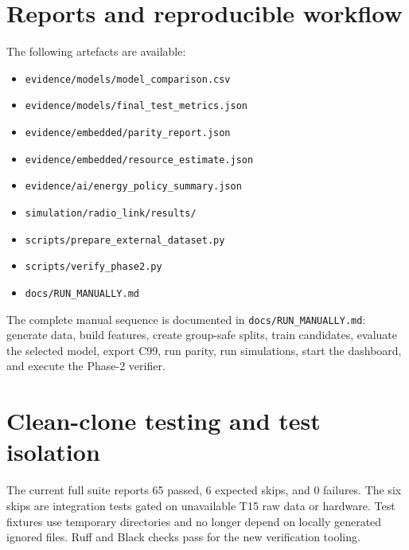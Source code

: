 \documentclass[11pt,a4paper]{article}
\begin{document}
\section{Reports and reproducible workflow}
The following artefacts are available:
\begin{itemize}[leftmargin=*]
  \item \texttt{evidence/models/model\_comparison.csv}
  \item \texttt{evidence/models/final\_test\_metrics.json}
  \item \texttt{evidence/embedded/parity\_report.json}
  \item \texttt{evidence/embedded/resource\_estimate.json}
  \item \texttt{evidence/ai/energy\_policy\_summary.json}
  \item \texttt{simulation/radio\_link/results/}
  \item \texttt{scripts/prepare\_external\_dataset.py}
  \item \texttt{scripts/verify\_phase2.py}
  \item \texttt{docs/RUN\_MANUALLY.md}
\end{itemize}
The complete manual sequence is documented in \texttt{docs/RUN\_MANUALLY.md}:
generate data, build features, create group-safe splits, train candidates,
evaluate the selected model, export C99, run parity, run simulations, start
the dashboard, and execute the Phase-2 verifier.

\section{Clean-clone testing and test isolation}
The current full suite reports 65 passed, 6 expected skips, and 0 failures.
The six skips are integration tests gated on unavailable T15 raw data or
hardware. Test fixtures use temporary directories and no longer depend on
locally generated ignored files. Ruff and Black checks pass for the new
verification tooling.
\end{document}

